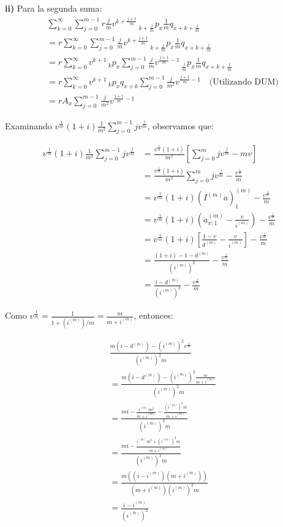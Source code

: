 \textbf{ii)} Para la segunda suma:
\begin{align}
&\sum_{k=0}^{\infty} \sum_{j=0}^{m-1} r\frac{j}{m} v^{k+\frac{j+1}{m}} \,_{k+\frac{j}{m}}p_x \frac{1}{m} q_{x+k+\frac{j}{m}} \\
&= r \sum_{k=0}^{\infty} \sum_{j=0}^{m-1} \frac{j}{m} v^{k+\frac{j+1}{m}} \,_{k+\frac{j}{m}}p_x \frac{1}{m} q_{x+k+\frac{j}{m}} \\
&= r \sum_{k=0}^{\infty} v^{k+1} \,_k p_x \sum_{j=0}^{m-1} \frac{j}{m} v^{\frac{j+1}{m}-1} \,_{\frac{j}{m}}p_x \frac{1}{m} q_{x+k+\frac{j}{m}} \\
&= r \sum_{k=0}^{\infty} v^{k+1} \,_k p_x q_{x+k} \sum_{j=0}^{m-1} \frac{j}{m^2} v^{\frac{j+1}{m}-1} \quad \text{(Utilizando DUM)} \\
&= r A_x \sum_{j=0}^{m-1} \frac{j}{m^2} v^{\frac{j+1}{m}-1}
\end{align}

Examinando $v^{\frac{1}{m}} (1 + i) \frac{1}{m^2} \sum_{j=0}^{m-1} j v^{\frac{j}{m}}$, observamos que:

\begin{align}
v^{\frac{1}{m}} (1 + i) \frac{1}{m^2} \sum_{j=0}^{m-1} j v^{\frac{j}{m}} &= \frac{v^{\frac{1}{m}} (1 + i)}{m^2} \left[\sum_{j=0}^{m} j v^{\frac{j}{m}} - m v\right] \\
&= \frac{v^{\frac{1}{m}} (1 + i)}{m^2} \sum_{j=0}^{m} j v^{\frac{j}{m}} - \frac{v^{\frac{1}{m}}}{m} \\
&= v^{\frac{1}{m}} (1 + i) (I^{(m)} \ddot{a})_1^{(m)} - \frac{v^{\frac{1}{m}}}{m} \\
&= v^{\frac{1}{m}} (1 + i) \left(\ddot{a}_{x:1}^{(m)} - \frac{v}{i^{(m)}}\right) - \frac{v^{\frac{1}{m}}}{m} \\
&= v^{\frac{1}{m}} (1 + i) \left[\frac{1-v}{d^{(m)}} - \frac{v}{i^{(m)}}\right] - \frac{v^{\frac{1}{m}}}{m} \\
&= \frac{(1 + i) - 1 - d^{(m)}}{(i^{(m)})^2} - \frac{v^{\frac{1}{m}}}{m} \\
&= \frac{i - d^{(m)}}{(i^{(m)})^2} - \frac{v^{\frac{1}{m}}}{m}
\end{align}

Como $v^{\frac{1}{m}} = \frac{1}{1+(i^{(m)})/m} = \frac{m}{m+i^{(m)}}$, entonces:

\begin{align}
&\frac{m(i - d^{(m)}) - (i^{(m)})^2 v^{\frac{1}{m}}}{(i^{(m)})^2 m} \\
&= \frac{m(i - d^{(m)}) - (i^{(m)})^2 \frac{m}{m+i^{(m)}}}{(i^{(m)})^2 m} \\
&= \frac{mi - \frac{i^{(m)} m^2}{m+i^{(m)}} - \frac{(i^{(m)})^2 m}{m+i^{(m)}}}{(i^{(m)})^2 m} \\
&= \frac{mi - \frac{i^{(m)} m^2 + (i^{(m)})^2 m}{m+i^{(m)}}}{(i^{(m)})^2 m} \\
&= \frac{m((i-i^{(m)})(m+i^{(m)}))}{(m+i^{(m)})(i^{(m)})^2 m} \\
&= \frac{i - i^{(m)}}{(i^{(m)})^2}
\end{align}


